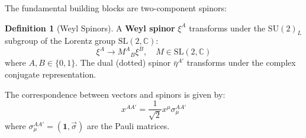 \documentclass[11pt,a4paper,twoside]{book}
\theoremstyle{definition}
\newtheorem{definition}{Definition}[chapter]
\newcommand{\SU}{\mathrm{SU}}
\begin{document}
The fundamental building blocks are two-component spinors:

\begin{definition}[Weyl Spinors]
A \textbf{Weyl spinor} $\xi^A$ transforms under the $\SU(2)_L$ subgroup of 
the Lorentz group $\mathrm{SL}(2, \mathbb{C})$:
\begin{equation}
    \xi^A \to M^A{}_B \xi^B, \quad M \in \mathrm{SL}(2, \mathbb{C})
\end{equation}
where $A, B \in \{0, 1\}$. The dual (dotted) spinor $\bar{\eta}^{A'}$ 
transforms under the complex conjugate representation.
\end{definition}

\begin{visualbox}
\begin{center}
\end{center}
\end{visualbox}

The correspondence between vectors and spinors is given by:
\begin{equation}
    x^{AA'} = \frac{1}{\sqrt{2}} x^{\mu} \sigma_{\mu}^{AA'}
\end{equation}
where $\sigma_{\mu}^{AA'} = (\mathbf{1}, \vec{\sigma})$ are the Pauli matrices.

\end{document}
